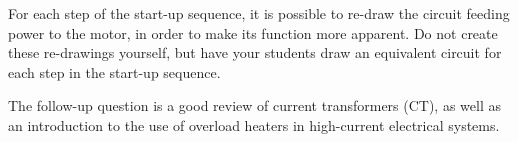 





For each step of the start-up sequence, it is possible to re-draw the circuit feeding power to the motor, in order to make its function more apparent.  Do not create these re-drawings yourself, but have your students draw an equivalent circuit for each step in the start-up sequence.

The follow-up question is a good review of current transformers (CT), as well as an introduction to the use of overload heaters in high-current electrical systems.




